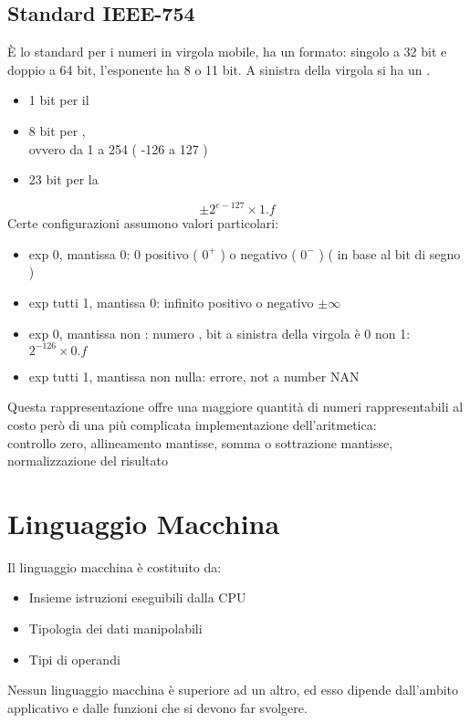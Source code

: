 \documentclass[arch.tex]{subfiles}
\begin{document}


\subsection{Standard IEEE-754}%
\label{sub:standard_ieee754}
È lo standard per i numeri in virgola mobile, ha un  formato: singolo
a 32 bit e doppio a 64 bit, l'esponente ha 8 o 11 bit. A sinistra della virgola si ha
un .

%
\label{ppar:FORMATO SINGOLO}
\begin{itemize}
	\item 1 bit per il  
	\item 8 bit per ,\\
		ovvero da 1 a 254 ( -126 a 127 ) 
	\item 23 bit per la  
\end{itemize}

\begin{equation}
	\pm 2^{e - 127} \times 1.f
\end{equation}
Certe configurazioni assumono valori particolari:

\begin{itemize}
	\item exp 0, mantissa 0: 0 positivo ( $0^+$ )  o negativo ( $ 0^- $  ) 
		( in base al bit di segno )
	\item exp tutti 1, mantissa 0: infinito positivo o negativo $ \pm  \infty $
	\item exp 0, mantissa non : numero ,
		bit a sinistra della virgola è 0 non 1: $ 2^{-126} \times 0.f $ 
	\item exp tutti 1, mantissa non nulla: errore, not a number NAN
\end{itemize}
Questa rappresentazione offre una maggiore quantità di numeri rappresentabili al costo
però di una più complicata implementazione dell'aritmetica:\\
controllo zero, allineamento mantisse, somma o sottrazione mantisse, normalizzazione del
risultato

\clearpage
\section{Linguaggio Macchina}%
\label{sub:linguaggio_macchina}

Il linguaggio macchina è costituito da:
\begin{itemize}
	\item Insieme istruzioni eseguibili dalla CPU
	\item Tipologia dei dati manipolabili
	\item Tipi di operandi
\end{itemize}
Nessun linguaggio macchina è superiore ad un altro, ed esso dipende dall'ambito
applicativo e dalle funzioni che si devono far svolgere.
\end{document}
